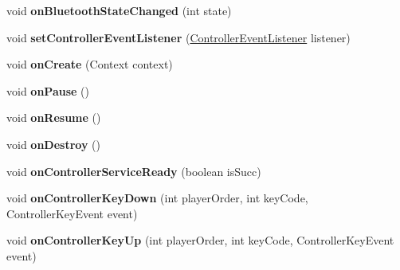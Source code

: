 \begin{DoxyCompactItemize}
void {\bfseries on\+Bluetooth\+State\+Changed} (int state)
\item 
\mbox{\label{classorg_1_1cocos2dx_1_1lib_1_1GameControllerNibiru_a037a139101f891fd6884e236fb2bea05}} 
void {\bfseries set\+Controller\+Event\+Listener} (\hyperlink{interfaceorg_1_1cocos2dx_1_1lib_1_1GameControllerDelegate_1_1ControllerEventListener}{Controller\+Event\+Listener} listener)
\item 
\mbox{\label{classorg_1_1cocos2dx_1_1lib_1_1GameControllerNibiru_a710d2d4f56e7c0e8a9f538e3c1cc5c43}} 
void {\bfseries on\+Create} (Context context)
\item 
\mbox{\label{classorg_1_1cocos2dx_1_1lib_1_1GameControllerNibiru_a1a39418386333c314a35a2434e5904a4}} 
void {\bfseries on\+Pause} ()
\item 
\mbox{\label{classorg_1_1cocos2dx_1_1lib_1_1GameControllerNibiru_a5dfe22ec05a1ebae2ce01e7fb6210ee2}} 
void {\bfseries on\+Resume} ()
\item 
\mbox{\label{classorg_1_1cocos2dx_1_1lib_1_1GameControllerNibiru_a819d31288161c2555c98f817335c9d69}} 
void {\bfseries on\+Destroy} ()
\item 
\mbox{\label{classorg_1_1cocos2dx_1_1lib_1_1GameControllerNibiru_a65a937c4f5268ea9308582a03df134ed}} 
void {\bfseries on\+Controller\+Service\+Ready} (boolean is\+Succ)
\item 
\mbox{\label{classorg_1_1cocos2dx_1_1lib_1_1GameControllerNibiru_a6d4edf3b78e2b1325a3405aa6d1044d9}} 
void {\bfseries on\+Controller\+Key\+Down} (int player\+Order, int key\+Code, Controller\+Key\+Event event)
\item 
\mbox{\label{classorg_1_1cocos2dx_1_1lib_1_1GameControllerNibiru_a7c865fca3e0a72baac4ad346e5b6fefa}} 
void {\bfseries on\+Controller\+Key\+Up} (int player\+Order, int key\+Code, Controller\+Key\+Event event)

\end{DoxyCompactItemize}
